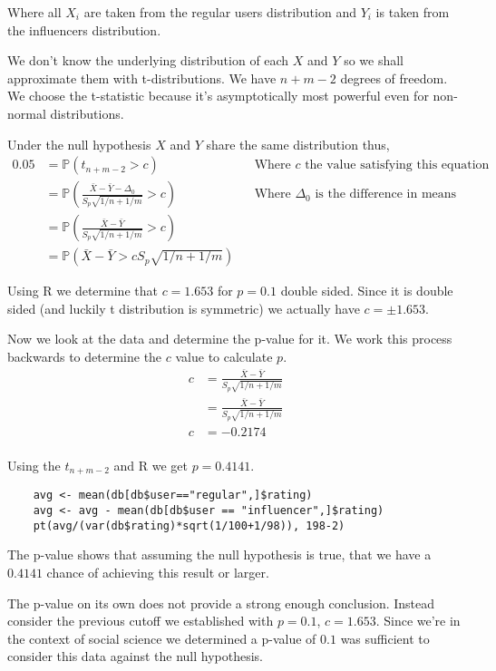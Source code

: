 \documentclass{article}
\newcommand{\prob}{\mathbb{P}}
\begin{document}
Where all $X_i$ are taken from the regular users distribution and $Y_i$ is taken
from the influencers distribution.

We don't know the underlying distribution of each $X$ and $Y$
so we shall approximate them with t-distributions. We have $n + m - 2$ degrees
of freedom. We choose the t-statistic because it's asymptotically most powerful
even for non-normal distributions.

Under the null hypothesis $X$ and $Y$ share the same distribution thus,
\begin{align*}
    0.05 &= \prob(t_{n+m-2} > c)
    &&\text{Where $c$ the value satisfying this equation} \\
    &= \prob\left(\frac{\bar{X} - \bar{Y} - \Delta_0}{S_p\sqrt{1/n + 1/m}} > c\right)
    &&\text{Where $\Delta_0$ is the difference in means} \\
    &= \prob\left(\frac{\bar{X} - \bar{Y}}{S_p\sqrt{1/n + 1/m}} > c\right) \\
    &= \prob\left(\bar{X} - \bar{Y} > c S_p\sqrt{1/n + 1/m}\right)
\end{align*}

Using R we determine that $c=1.653$ for $p=0.1$ double sided.
Since it is double sided (and luckily t distribution is symmetric)
we actually have $c=\pm1.653$.

Now we look at the data and determine the p-value for it.
We work this process backwards to determine the $c$ value to calculate $p$.
\begin{align*}
    c &= \frac{\bar{X} - \bar{Y}}{S_p\sqrt{1/n + 1/m}} \\
    &= \frac{\bar{X} - \bar{Y}}{S_p\sqrt{1/n + 1/m}} \\
    c &= -0.2174 \\
\end{align*}

Using the $t_{n+m-2}$ and R we get $p = 0.4141$.
\begin{verbatim}
    avg <- mean(db[db$user=="regular",]$rating)
    avg <- avg - mean(db[db$user == "influencer",]$rating)
    pt(avg/(var(db$rating)*sqrt(1/100+1/98)), 198-2)
\end{verbatim}

The p-value shows that assuming the null hypothesis is true, that we have a $0.4141$ 
chance of achieving this result or larger.

The p-value on its own does not provide a strong enough conclusion. Instead
consider the previous cutoff we established with $p=0.1$, $c=1.653$.
Since we're in the context of social science we determined a p-value of
$0.1$ was sufficient to consider this data against the null hypothesis.
\end{document}
